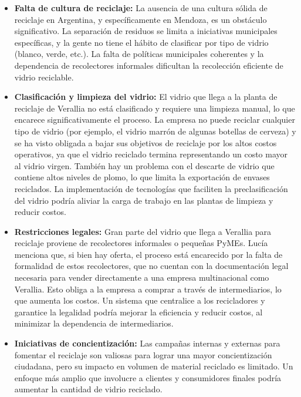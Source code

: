 \begin{itemize}
		\item \textbf{Falta de cultura de reciclaje:} La ausencia de una cultura sólida de reciclaje en Argentina, y específicamente en Mendoza, es un obstáculo significativo. La separación de residuos se limita a iniciativas municipales específicas, y la gente no tiene el hábito de clasificar por tipo de vidrio (blanco, verde, etc.). La falta de políticas municipales coherentes y la dependencia de recolectores informales dificultan la recolección eficiente de vidrio reciclable.

		\item \textbf{Clasificación y limpieza del vidrio:} El vidrio que llega a la planta de reciclaje de Verallia no está clasificado y requiere una limpieza manual, lo que encarece significativamente el proceso. La empresa no puede reciclar cualquier tipo de vidrio (por ejemplo, el vidrio marrón de algunas botellas de cerveza) y se ha visto obligada a bajar sus objetivos de reciclaje por los altos costos operativos, ya que el vidrio reciclado termina representando un costo mayor al vidrio virgen. También hay un problema con el descarte de vidrio que contiene altos niveles de plomo, lo que limita la exportación de envases reciclados. La implementación de tecnologías que faciliten la preclasificación del vidrio podría aliviar la carga de trabajo en las plantas de limpieza y reducir costos.

		\item \textbf{Restricciones legales:} Gran parte del vidrio que llega a Verallia para reciclaje proviene de recolectores informales o pequeñas PyMEs. Lucía menciona que, si bien hay oferta, el proceso está encarecido por la falta de formalidad de estos recolectores, que no cuentan con la documentación legal necesaria para vender directamente a una empresa multinacional como Verallia. Esto obliga a la empresa a comprar a través de intermediarios, lo que aumenta los costos. Un sistema que centralice a los recicladores y garantice la legalidad podría mejorar la eficiencia y reducir costos, al minimizar la dependencia de intermediarios.

		\item \textbf{Iniciativas de concientización:} Las campañas internas y externas para fomentar el reciclaje son valiosas para lograr una mayor concientización ciudadana, pero su impacto en volumen de material reciclado es limitado. Un enfoque más amplio que involucre a clientes y consumidores finales podría aumentar la cantidad de vidrio reciclado.
		

\end{itemize}
